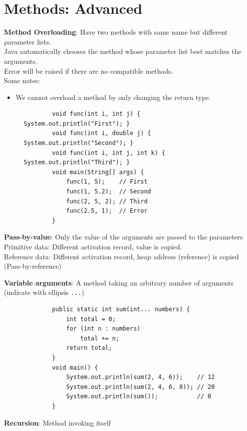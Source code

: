 \documentclass{article}
\begin{document}
\section{Methods: Advanced}
\textbf{Method Overloading}: Have two methods with same name but different parameter lists.\\
Java automatically chooses the method whose parameter list best matches the arguments.\\
Error will be raised if there are no compatible methods.\\
Some notes:
\begin{itemize}
	\item We cannot overload a method by only changing the return type.
\end{itemize}

\begin{figure}[h!]
	\centering
	\begin{verbatim}
		void func(int i, int j) { System.out.println("First"); }
		void func(int i, double j) { System.out.println("Second"); }
		void func(int i, int j, int k) { System.out.println("Third"); }
		void main(String[] args) {
		    func(1, 5);    // First
		    func(1, 5.2);  // Second
		    func(2, 5, 2); // Third
		    func(2.5, 1);  // Error
		}
	\end{verbatim}
\end{figure}

\textbf{Pass-by-value}: Only the value of the arguments are passed to the parameters\\
Primitive data: Different activation record, value is copied.\\
Reference data: Different activation record, heap address (reference) is copied (Pass-by-reference)

\textbf{Variable arguments}: A method taking an arbitrary number of arguments (indicate with ellipsis \texttt{...})

\begin{figure}[h!]
	\centering
	\begin{verbatim}
		public static int sum(int... numbers) {
		    int total = 0;
		    for (int n : numbers)
		        total += n;
		    return total;
		}
		void main() {
		    System.out.println(sum(2, 4, 6));    // 12
		    System.out.println(sum(2, 4, 6, 8)); // 20
		    System.out.println(sum());           // 0
		}
	\end{verbatim}
\end{figure}

\textbf{Recursion}: Method invoking itself
\end{document}
